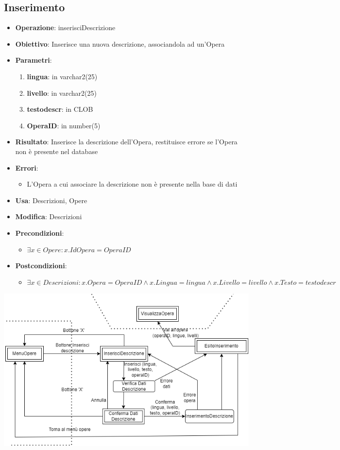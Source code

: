 \subsection{Inserimento}
\begin{itemize}
	\item \textbf{Operazione}: inserisciDescrizione
	\item \textbf{Obiettivo}: Inserisce una nuova descrizione, associandola ad un'Opera
	\item \textbf{Parametri}:
	\begin{enumerate}
		\item \textbf{lingua}: in varchar2(25)
		\item \textbf{livello}: in varchar2(25)
		\item \textbf{testodescr}: in CLOB
		\item \textbf{OperaID}: in number(5)
	\end{enumerate}
	\item \textbf{Risultato}: Inserisce la descrizione dell'Opera, restituisce errore se l'Opera non è presente nel database
	\item \textbf{Errori}: 
	\begin{itemize}
		\item L'Opera a cui associare la descrizione non è presente nella base di dati
	\end{itemize}
	\item \textbf{Usa}: Descrizioni, Opere
	\item \textbf{Modifica}: Descrizioni
	\item \textbf{Precondizioni}:
	\begin{itemize}
		\item $\exists x \in Opere : x.IdOpera = OperaID$
	\end{itemize}
	\item \textbf{Postcondizioni}:
	\begin{itemize}
		\item $\exists x \in Descrizioni : x.Opera = OperaID \land x.Lingua = lingua \land x.Livello = livello \land x.Testo = testodescr$
	\end{itemize}
\end{itemize}
\includegraphics[width=\textwidth]{img/InserDescr.png}\\[1cm]


